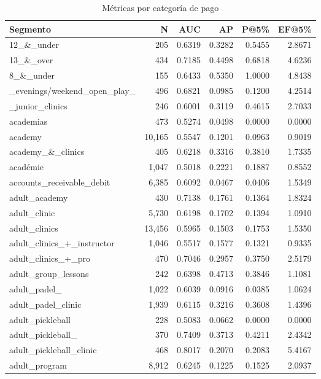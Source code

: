 \begin{table}[htbp]
\centering
\small
\caption{M\'{e}tricas por categor\'{i}a de pago}
\label{tab:metrics-by-category}
\begin{tabular}{lrrrrr}
\toprule
Segmento & N & AUC & AP & P@5\% & EF@5\% \\
\midrule
  12\_\&\_under & 205 & 0.6319 & 0.3282 & 0.5455 & 2.8671 \\
  13\_\&\_over & 434 & 0.7185 & 0.4498 & 0.6818 & 4.6236 \\
  8\_\&\_under & 155 & 0.6433 & 0.5350 & 1.0000 & 4.8438 \\
  \_evenings/weekend\_open\_play\_ & 496 & 0.6821 & 0.0985 & 0.1200 & 4.2514 \\
  \_junior\_clinics & 246 & 0.6001 & 0.3119 & 0.4615 & 2.7033 \\
  academias & 473 & 0.5274 & 0.0498 & 0.0000 & 0.0000 \\
  academy & 10,165 & 0.5547 & 0.1201 & 0.0963 & 0.9019 \\
  academy\_\&\_clinics & 405 & 0.6218 & 0.3316 & 0.3810 & 1.7335 \\
  académie & 1,047 & 0.5018 & 0.2221 & 0.1887 & 0.8552 \\
  accounts\_receivable\_debit & 6,385 & 0.6092 & 0.0467 & 0.0406 & 1.5349 \\
  adult\_academy & 430 & 0.7138 & 0.1761 & 0.1364 & 1.8324 \\
  adult\_clinic & 5,730 & 0.6198 & 0.1702 & 0.1394 & 1.0910 \\
  adult\_clinics & 13,456 & 0.5965 & 0.1503 & 0.1753 & 1.5350 \\
  adult\_clinics\_+\_instructor & 1,046 & 0.5517 & 0.1577 & 0.1321 & 0.9335 \\
  adult\_clinics\_+\_pro & 470 & 0.7046 & 0.2957 & 0.3750 & 2.5179 \\
  adult\_group\_lessons & 242 & 0.6398 & 0.4713 & 0.3846 & 1.1081 \\
  adult\_padel\_ & 1,022 & 0.6039 & 0.0916 & 0.0385 & 1.0624 \\
  adult\_padel\_clinic & 1,939 & 0.6115 & 0.3216 & 0.3608 & 1.4396 \\
  adult\_pickleball & 228 & 0.5083 & 0.0662 & 0.0000 & 0.0000 \\
  adult\_pickleball\_ & 370 & 0.7409 & 0.3713 & 0.4211 & 2.4342 \\
  adult\_pickleball\_clinic & 468 & 0.8017 & 0.2070 & 0.2083 & 5.4167 \\
  adult\_program & 8,912 & 0.6245 & 0.1225 & 0.1525 & 2.0937 \\

\end{tabular}
\end{table}
